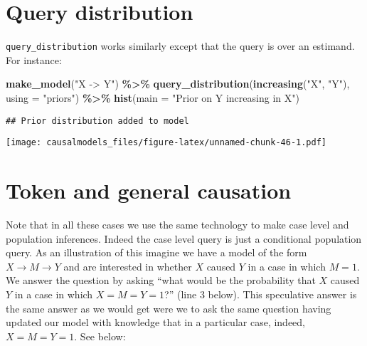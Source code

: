\documentclass[
  12pt,
]{book}
\newenvironment{Shaded}{\begin{snugshade}}{\end{snugshade}}
\newcommand{\AttributeTok}[1]{\textcolor[rgb]{0.13,0.29,0.53}{#1}}
\newcommand{\FunctionTok}[1]{\textcolor[rgb]{0.13,0.29,0.53}{\textbf{#1}}}
\newcommand{\NormalTok}[1]{#1}
\newcommand{\SpecialCharTok}[1]{\textcolor[rgb]{0.81,0.36,0.00}{\textbf{#1}}}
\newcommand{\StringTok}[1]{\textcolor[rgb]{0.31,0.60,0.02}{#1}}
\begin{document}
\hypertarget{query-distribution}{%
\section{Query distribution}\label{query-distribution}}

\texttt{query\_distribution} works similarly except that the query is over an estimand. For instance:

\begin{Shaded}
\begin{Highlighting}[]
\FunctionTok{make\_model}\NormalTok{(}\StringTok{"X {-}\textgreater{} Y"}\NormalTok{) }\SpecialCharTok{\%\textgreater{}\%} 
  \FunctionTok{query\_distribution}\NormalTok{(}\FunctionTok{increasing}\NormalTok{(}\StringTok{"X"}\NormalTok{, }\StringTok{"Y"}\NormalTok{), }\AttributeTok{using =} \StringTok{"priors"}\NormalTok{) }\SpecialCharTok{\%\textgreater{}\%}
 \FunctionTok{hist}\NormalTok{(}\AttributeTok{main =} \StringTok{"Prior on Y increasing in X"}\NormalTok{)  }
\end{Highlighting}
\end{Shaded}

\begin{verbatim}
## Prior distribution added to model
\end{verbatim}

\texttt{[image: causalmodels\_files/figure-latex/unnamed-chunk-46-1.pdf]}

\hypertarget{token-and-general-causation}{%
\section{Token and general causation}\label{token-and-general-causation}}

Note that in all these cases we use the same technology to make case level and population inferences. Indeed the case level query is just a conditional population query. As an illustration of this imagine we have a model of the form \(X \rightarrow M \rightarrow Y\) and are interested in whether \(X\) caused \(Y\) in a case in which \(M=1\). We answer the question by asking ``what would be the probability that \(X\) caused \(Y\) in a case in which \(X=M=Y=1\)?'' (line 3 below). This speculative answer is the same answer as we would get were we to ask the same question having updated our model with knowledge that in a particular case, indeed, \(X=M=Y=1\). See below:
\end{document}

